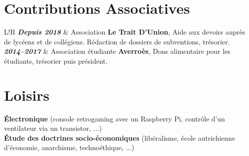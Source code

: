 \documentclass[10pt]{article}
\newcommand\VRule{\color{lightgray}\vrule width 2pt}
\begin{document}
\vspace{1ex}

\section*{Contributions Associatives}

\vspace{2ex}

\begin{tabular}{L!{\VRule}R}
\textbf{\textit{Depuis 2018}} & Association \textbf{Le Trait D’Union}, Aide aux devoirs auprès de lycéens et de collégiens. Rédaction de dossiers de subventions, trésorier. \\[0.75cm]

\textbf{\textit{2014--2017}} & Association étudiante \textbf{Averroès}, Dons alimentaire pour les étudiants, trésorier puis président. \\
\end{tabular}

\section*{Loisirs}

\vspace{2ex}

\hspace*{1ex} \textbf{Électronique} (console retrogaming avec un Raspberry Pi, contrôle d'un ventilateur via un transistor, ...) \\
\hspace*{1ex} \textbf{Étude des doctrines socio-économiques} (libéralisme, école autrichienne d'économie, anarchisme, technoéthique, ...) \\
\end{document}
